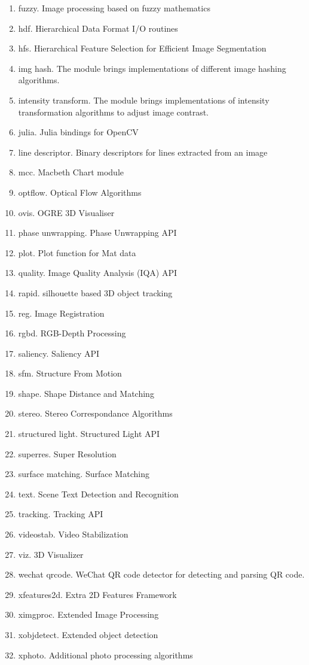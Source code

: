 \begin{enumerate}
     \item fuzzy. Image processing based on fuzzy mathematics
     \item hdf. Hierarchical Data Format I/O routines
     \item hfs. Hierarchical Feature Selection for Efficient Image Segmentation
     \item img hash. The module brings implementations of different image hashing algorithms.
     \item intensity transform. The module brings implementations of intensity transformation algorithms to adjust image contrast.
     \item julia. Julia bindings for OpenCV
     \item line descriptor. Binary descriptors for lines extracted from an image
     \item mcc. Macbeth Chart module
     \item optflow. Optical Flow Algorithms
     \item ovis. OGRE 3D Visualiser
     \item phase unwrapping. Phase Unwrapping API
     \item plot. Plot function for Mat data
     \item quality. Image Quality Analysis (IQA) API
     \item rapid. silhouette based 3D object tracking
     \item reg. Image Registration
     \item rgbd. RGB-Depth Processing
     \item saliency. Saliency API
     \item sfm. Structure From Motion
     \item shape. Shape Distance and Matching
     \item stereo. Stereo Correspondance Algorithms
     \item structured light. Structured Light API
     \item superres. Super Resolution
     \item surface matching. Surface Matching
     \item text. Scene Text Detection and Recognition
     \item tracking. Tracking API
     \item videostab. Video Stabilization
     \item viz. 3D Visualizer
     \item wechat qrcode. WeChat QR code detector for detecting and parsing QR code.
     \item xfeatures2d. Extra 2D Features Framework
     \item ximgproc. Extended Image Processing
     \item xobjdetect. Extended object detection
     \item xphoto. Additional photo processing algorithms
\end{enumerate}

